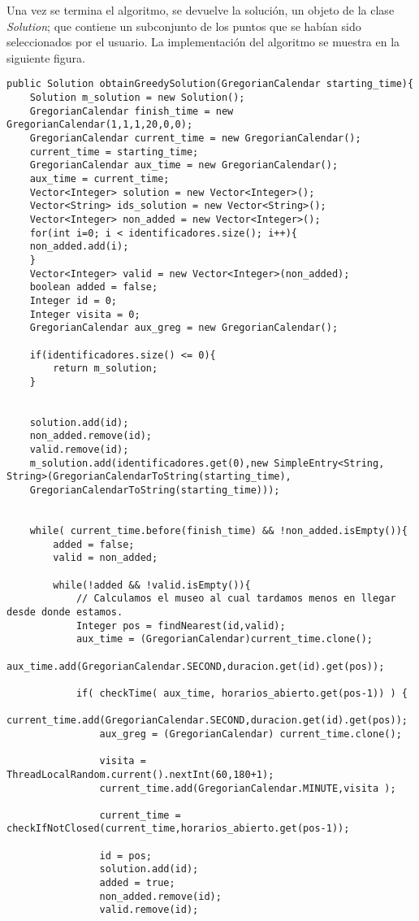 Una vez se termina el algoritmo, se devuelve la solución, un objeto de la clase \textit{Solution}; que contiene un subconjunto de los puntos que se habían sido seleccionados por el usuario. La implementación del algoritmo se muestra en la siguiente figura.\newline
\begin{lstlisting}[caption=Función para encontrar la ruta entre los puntos seleccionados]
public Solution obtainGreedySolution(GregorianCalendar starting_time){
	Solution m_solution = new Solution();
	GregorianCalendar finish_time = new GregorianCalendar(1,1,1,20,0,0);
	GregorianCalendar current_time = new GregorianCalendar();
	current_time = starting_time;
	GregorianCalendar aux_time = new GregorianCalendar();
	aux_time = current_time;
	Vector<Integer> solution = new Vector<Integer>();
	Vector<String> ids_solution = new Vector<String>();
	Vector<Integer> non_added = new Vector<Integer>();
	for(int i=0; i < identificadores.size(); i++){
	non_added.add(i);
	}
	Vector<Integer> valid = new Vector<Integer>(non_added);
	boolean added = false;
	Integer id = 0;
	Integer visita = 0;
	GregorianCalendar aux_greg = new GregorianCalendar();
	
	if(identificadores.size() <= 0){
		return m_solution;
	}
	

	solution.add(id);
	non_added.remove(id);
	valid.remove(id);
	m_solution.add(identificadores.get(0),new SimpleEntry<String, String>(GregorianCalendarToString(starting_time),
	GregorianCalendarToString(starting_time)));
	
	
	while( current_time.before(finish_time) && !non_added.isEmpty()){
		added = false;
		valid = non_added;
	
		while(!added && !valid.isEmpty()){
			// Calculamos el museo al cual tardamos menos en llegar desde donde estamos.
			Integer pos = findNearest(id,valid);
			aux_time = (GregorianCalendar)current_time.clone();
			aux_time.add(GregorianCalendar.SECOND,duracion.get(id).get(pos));
			
			if( checkTime( aux_time, horarios_abierto.get(pos-1)) ) {
				current_time.add(GregorianCalendar.SECOND,duracion.get(id).get(pos));
				aux_greg = (GregorianCalendar) current_time.clone();
				
				visita = ThreadLocalRandom.current().nextInt(60,180+1);
				current_time.add(GregorianCalendar.MINUTE,visita );
				
				current_time = checkIfNotClosed(current_time,horarios_abierto.get(pos-1));
				
				id = pos;
				solution.add(id);
				added = true;
				non_added.remove(id);
				valid.remove(id);
				

\end{lstlisting}

